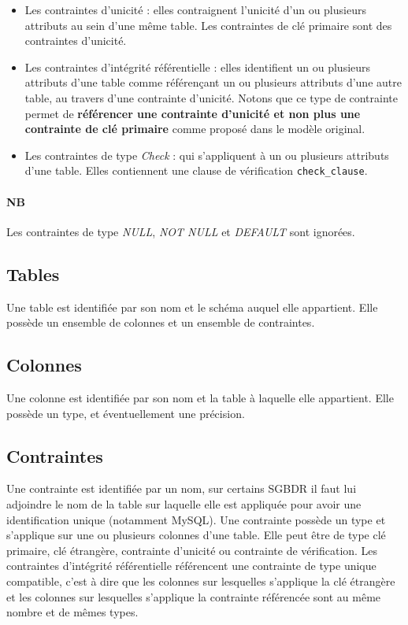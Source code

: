 \begin{itemize}
\item Les contraintes d'unicité : elles contraignent l'unicité d'un ou plusieurs attributs au sein d'une même table. Les contraintes de clé primaire sont des contraintes d'unicité.
\item Les contraintes d'intégrité référentielle : elles identifient un ou plusieurs attributs d'une table comme référençant un ou plusieurs attributs d'une autre table, au travers d'une contrainte d'unicité. Notons que ce type de contrainte permet de \textbf{référencer une contrainte d'unicité et non plus une contrainte de clé primaire} comme proposé dans le modèle original.
\item Les contraintes de type \emph{Check} : qui s'appliquent à un ou plusieurs attributs d'une table. Elles contiennent une clause de vérification \texttt{check\_clause}.
\end{itemize}

\paragraph*{NB}
Les contraintes de type \emph{NULL}, \emph{NOT NULL} et \emph{DEFAULT} sont ignorées.

	\subsection{Tables}
		Une table est identifiée par son nom et le schéma auquel elle appartient. Elle possède un ensemble de colonnes et un ensemble de contraintes.
	\subsection{Colonnes}
		Une colonne est identifiée par son nom et la table à laquelle elle appartient. Elle possède un type, et éventuellement une précision. 
	\subsection{Contraintes}
		Une contrainte est identifiée par un nom, sur certains SGBDR il faut lui adjoindre le nom de la table sur laquelle elle est appliquée pour avoir une identification unique (notamment MySQL). Une contrainte possède un type et s'applique sur une ou plusieurs colonnes d'une table. Elle peut être de type clé primaire, clé étrangère, contrainte d'unicité ou contrainte de vérification. Les contraintes d'intégrité référentielle référencent une contrainte de type unique compatible, c'est à dire que les colonnes sur lesquelles s'applique la clé étrangère et les colonnes sur lesquelles s'applique la contrainte référencée sont au même nombre et de mêmes types.
		
